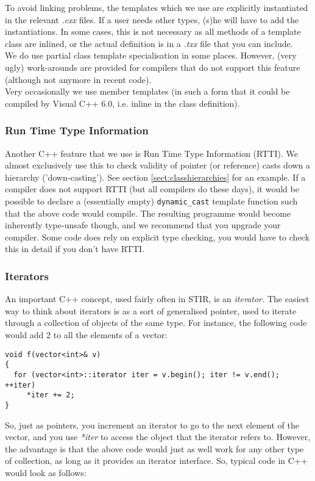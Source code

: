 \documentclass{article}
\begin{document}
To avoid linking problems, the templates which we use are explicitly 
instantiated in the relevant \textit{.cxx} files. If a user needs 
other types, (s)he will have to add the instantiations. In some cases,
this is not necessary as all methods of a template class are inlined, or the
actual definition is in a \textit{.txx} file that you can include.\\
We do use partial class template specialisation in some places. 
However, (very ugly) work-arounds are provided for compilers 
that do not support this feature (although not anymore in recent code).\\
Very occasionally we use member templates (in such a form that 
it could be compiled by Visual C++ 6.0, i.e. inline in the class definition). 

\subsubsection{Run Time Type Information}
Another C++ feature that we use is Run Time Type 
Information (RTTI). We almost exclusively use this to check validity 
of pointer (or reference) casts down a hierarchy ('down-casting'). 
See section \ref{sect:classhierarchies} 
for an example. If a compiler does not support 
RTTI (but all compilers do these days), it would be possible to declare 
a (essentially empty) \texttt{dynamic\_cast} 
template function such that the above code would compile. The 
resulting programme would become inherently type-unsafe though, 
and we recommend that you upgrade your compiler. Some code does 
rely on explicit type checking, you would have to check this 
in detail if you don't have RTTI.

\subsubsection{
Iterators}

An important C++ concept, used fairly often in STIR, is an \textit{iterator.} The 
easiest way to think about iterators is as a sort of generalised 
pointer, used to iterate through a collection of objects of the 
same type. For instance, the following code would add 2 to all 
the elements of a vector:

\begin{verbatim}
void f(vector<int>& v)
{
  for (vector<int>::iterator iter = v.begin(); iter != v.end(); ++iter)
     *iter += 2;
}
\end{verbatim}


So, just as pointers, you increment an iterator to go to the 
next element of the vector, and you use \textit{*iter} to access the 
object that the iterator refers to. However, the advantage is 
that the above code would just as well work for any other type 
of collection, as long as it provides an iterator interface. 
So, typical code in C++ would look as follows:
\end{document}
